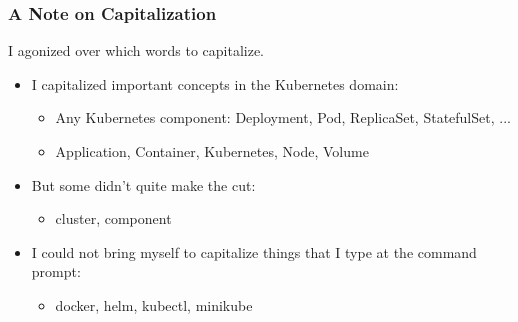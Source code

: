     \begin{frame}
        \frametitle{A Note on Capitalization}
        I agonized over which words to capitalize.
        \begin{itemize}
            \item{I capitalized important concepts in the Kubernetes domain:}
            \begin{itemize}
                \item{Any Kubernetes component: Deployment, Pod, ReplicaSet, StatefulSet, ...}
                \item{Application, Container, Kubernetes, Node, Volume}
            \end{itemize}

            \item{But some didn't quite make the cut:}
            \begin{itemize}
                \item{cluster, component}
            \end{itemize}

            \item{I could not bring myself to capitalize things that I type at the command prompt:}
            \begin{itemize}
                \item{docker, helm, kubectl, minikube}
            \end{itemize}
        \end{itemize}
    \end{frame}


